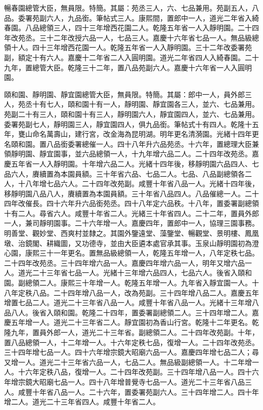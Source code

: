 \begin{pinyinscope}
暢春園總管大臣，無員限。特簡。其屬：苑丞三人，六、七品兼用。苑副五人，八品。委署苑副六人，九品銜。筆帖式三人。康熙間，置郎中一人，道光二年省入綺春園。八品總領三人，四十三年增西花園二人。乾隆五年省一人入靜明園。二十四年改苑丞。三十二年改授六品一人，七品三人。嘉慶十六年省七品一人。無品級總領十人。四十三年增西花園一人。乾隆五年省一人入靜明園。三十二年改委署苑副，額定十有六人。嘉慶十二年省二人入圓明園。道光二年省四人入綺春園。二十九年，置總管大臣。乾隆三十二年，置八品苑副六人。嘉慶十六年省一人入圓明園。

頤和園、靜明園、靜宜園總管大臣，無員限。特簡。其屬：郎中一人，員外郎三人，苑丞十有七人，頤和園十有一人，靜明園、靜宜園各三人，並六、七品兼用。苑副二十有三人，頤和園十有三人，靜明園六人，靜宜園四人，並六、七品兼用。委署苑副七人，靜明園三人，靜宜園四人，俱九品銜。筆帖式十有四人。乾隆十五年，甕山命名萬壽山，建行宮，改金海為昆明湖。明年更名清漪園。光緒十四年更名頤和園。置八品銜委署總催一人。四十八年升六品苑丞。十六年，置總理大臣兼領靜明園、靜宜園事，並六品總領一人，十九年增六品二人。二十四年改苑丞。嘉慶五年省一人入靜明園。十年增六品二人。光緒十四年後，移靜明園六品四人、七品六人，賡續置為本園員額。三十年省六品、七品二人。七品、八品副總領各二人，十八年增七品六人。二十四年改苑副。咸豐十年省八品一人。光緒十四年後，移靜明園八品八人，賡續置為本園員額。三十年省八品四人。八品催總一人。二十四年改催長。四十六年升六品銜苑丞。四十八年定六品秩。十八年，置委署副總領十有二人。尋省六人。咸豐十年省二人。光緒三十年省四人。二十二年，置員外郎一人，兼司靜明園事。二十六年增一人。嘉慶四年，置郎中一人，協理三園事務。明善堂、觀妙堂、西爽村並隸之。其園外鑒遠堂、藻鑒堂、暢觀堂、景明樓、鳳凰墩、治鏡閣、耕織圖，又功德寺，並由大臣遴本處官承其事。玉泉山靜明園初為澄心園，康熙三十一年更名。置無品級總領一人，乾隆五年增一人，八年定秩七品。二十四年改苑丞。三十四年增六品一人。嘉慶四年增六品一人，明年又增六品一人。道光二十三年省七品一人。光緒十三年增六品四人，七品六人。後省入頤和園。副總領二人。康熙三十年增一人。乾隆五年增一人。九年省入靜宜園一人。十八年定秩八品。二十四年增八品一人，改為苑副。三十四年增八品二人。嘉慶五年增置七品二人。道光二十三年省八品一人。咸豐十年省八品一人。光緒十三年增八品八人。後省入頤和園。乾隆二十四年，置委署副總領二人。三十四年增二人。嘉慶五年增一人。道光二十三年省二人。靜宜園初為香山行宮。乾隆十二年更名。乾隆九年，置員外郎一人，道光二十三年省。副總領二人。二十四年改苑副。十年，置八品總領一人，十二年增一人。十六年定秩七品，復增一人。二十四年改苑丞。三十四年增七品一人。四十六年增宗鏡大昭廟六品一人。嘉慶四年增七品二人；尋又增一人。道光二十三年省六品一人，七品二人。無品級副總領一人。十二年增一人。十六年定秩八品，復增一人。二十四年改苑副。三十四年增八品一人。四十六年增宗鏡大昭廟七品一人。四十八年增普覺寺七品一人。道光二十三年省八品三人。咸豐十年省八品一人。二十六年，置委署苑副六人。三十四年增二人。四十年增二人。道光二十三年省四人。咸豐十年省二人。


\end{pinyinscope}
